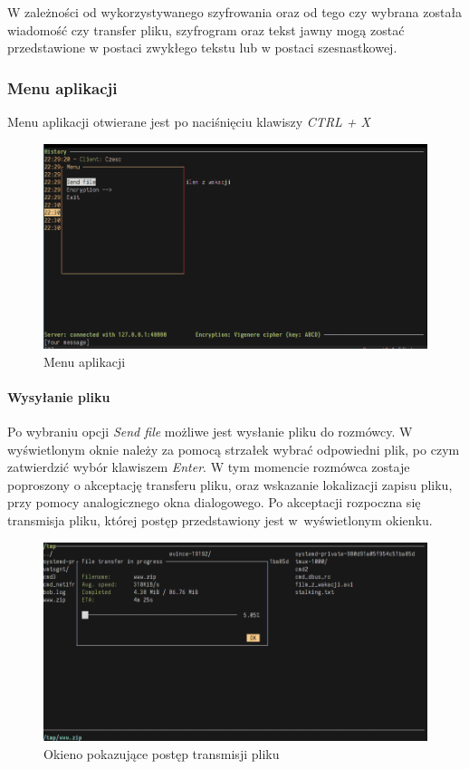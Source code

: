\documentclass{article}
\begin{document}
      W zależności od wykorzystywanego szyfrowania oraz od tego czy wybrana została wiadomość czy transfer pliku,
      szyfrogram oraz tekst jawny mogą zostać przedstawione w postaci zwykłego tekstu lub w postaci szesnastkowej.

    \subsubsection{Menu aplikacji}
      Menu aplikacji otwierane jest po naciśnięciu klawiszy \emph{CTRL + X}

    \begin{figure}[H]
        \centering
        \includegraphics[scale=0.4]{menu_aplikacji}
        \caption{Menu aplikacji}
        \label{APPLICATION_MENU}
    \end{figure}

    \paragraph{Wysyłanie pliku}
      Po wybraniu opcji \emph{Send file} możliwe jest wysłanie pliku do rozmówcy. W wyświetlonym oknie należy za
      pomocą strzałek wybrać odpowiedni plik, po czym zatwierdzić wybór klawiszem \emph{Enter}. W tym momencie
      rozmówca zostaje poproszony o akceptację transferu pliku, oraz wskazanie lokalizacji zapisu pliku, przy
      pomocy analogicznego okna dialogowego. Po akceptacji rozpoczna się transmisja pliku, której postęp
      przedstawiony jest w~wyświetlonym okienku.

    \begin{figure}[h]
        \centering
        \includegraphics[scale=0.4]{transfer_pliku}
        \caption{Okieno pokazujące postęp transmisji pliku}
        \label{FILE_TRANSFER_PROGRESS}
    \end{figure}
\end{document}
